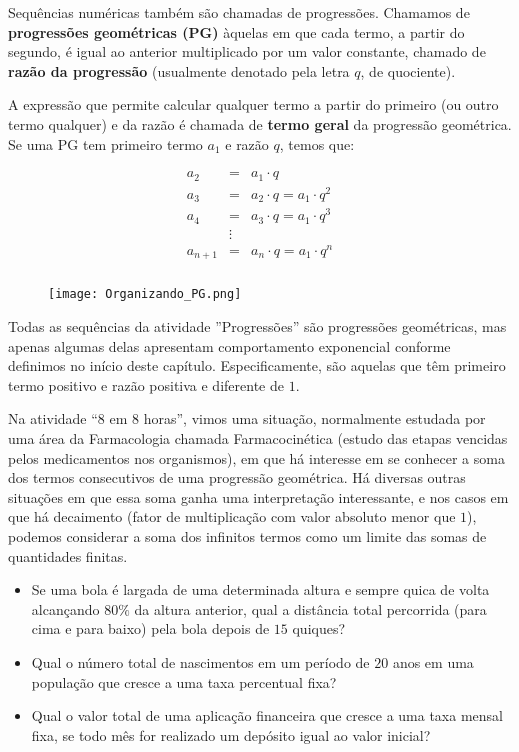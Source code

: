 
Sequências numéricas também são chamadas de progressões. Chamamos de \textbf{progressões geométricas (PG)} àquelas em que cada termo, a partir do segundo, é igual ao anterior multiplicado por um valor constante, chamado de \textbf{razão da progressão} (usualmente denotado pela letra $q$, de quociente). 

A expressão que permite calcular qualquer termo a partir do primeiro (ou outro termo qualquer) e da razão é chamada de \textbf{termo geral} da progressão geométrica. Se uma PG tem primeiro termo $a_{1}$ e razão $q$, temos que:

\begin{eqnarray*}
a_2 &=& a_1 \cdot q\\
a_3 &=& a_2 \cdot q=a_1 \cdot q^2\\
a_4 &=& a_3 \cdot q=a_1 \cdot q^3\\
&\vdots& \\
a_{n+1} &=& a_n \cdot q=a_1 \cdot q^n\\
\end{eqnarray*}

\begin{figure}[H]
\centering
\texttt{[image: Organizando\_PG.png]}
\end{figure}

Todas as sequências da atividade ”Progressões” são progressões geométricas, mas apenas algumas delas apresentam comportamento exponencial conforme definimos no início deste capítulo. Especificamente, são aquelas que têm primeiro termo positivo e razão positiva e diferente de $1$.

Na atividade “8 em 8 horas”, vimos uma situação, normalmente estudada por uma área da Farmacologia chamada Farmacocinética (estudo das etapas vencidas pelos medicamentos nos organismos), em que há interesse em se conhecer a soma dos termos consecutivos de uma progressão geométrica. Há diversas outras situações em que essa soma ganha uma interpretação interessante, e nos casos em que há decaimento (fator de multiplicação com valor absoluto menor que $1$), podemos considerar a soma dos infinitos termos como um limite das somas de quantidades finitas.

\begin{itemize}

\item Se uma bola é largada de uma determinada altura e sempre quica de volta alcançando $80\%$ da altura anterior, qual a distância total percorrida (para cima e para baixo) pela bola depois de $15$ quiques?

\item Qual o número total de nascimentos em um período de $20$ anos em uma população que cresce a uma taxa percentual fixa?

\item Qual o valor total de uma aplicação financeira que cresce a uma taxa mensal fixa, se todo mês for realizado um depósito igual ao valor inicial?

\end{itemize}

